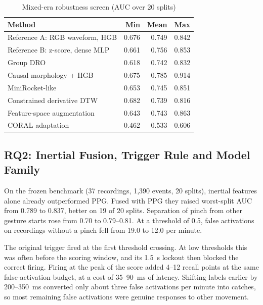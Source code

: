 \begin{table}[t]
  \centering
  \caption{Mixed-era robustness screen (AUC over 20 splits)}
  \label{tab:mixed}
  \small
  \begin{tabular}{@{}lrrr@{}}
    \toprule
    Method & Min & Mean & Max \\
    \midrule
    Reference A: RGB waveform, HGB & 0.676 & 0.749 & 0.842 \\
    Reference B: z-score, dense MLP & 0.661 & 0.756 & 0.853 \\
    Group DRO~\cite{sagawa2019dro} & 0.618 & 0.742 & 0.832 \\
    Causal morphology + HGB & 0.675 & 0.785 & 0.914 \\
    MiniRocket-like~\cite{dempster2020minirocket} & 0.653 & 0.745 & 0.851 \\
    Constrained derivative DTW & 0.682 & 0.739 & 0.816 \\
    Feature-space augmentation & 0.643 & 0.743 & 0.863 \\
    CORAL adaptation~\cite{sun2016coral} & 0.462 & 0.533 & 0.606 \\
    \bottomrule
  \end{tabular}
\end{table}

\subsection{RQ2: Inertial Fusion, Trigger Rule and Model Family}

On the frozen benchmark (37 recordings, 1{,}390 events, 20 splits), inertial features alone already outperformed PPG. Fused with PPG they raised worst-split AUC from 0.789 to 0.837, better on 19 of 20 splits. Separation of pinch from other gesture starts rose from 0.70 to 0.79--0.81. At a threshold of 0.5, false activations on recordings without a pinch fell from 19.0 to 12.0 per minute.

The original trigger fired at the first threshold crossing. At low thresholds this was often before the scoring window, and its 1.5~s lockout then blocked the correct firing. Firing at the peak of the score added 4--12 recall points at the same false-activation budget, at a cost of 35--90~ms of latency. Shifting labels earlier by 200--350~ms converted only about three false activations per minute into catches, so most remaining false activations were genuine responses to other movement.

